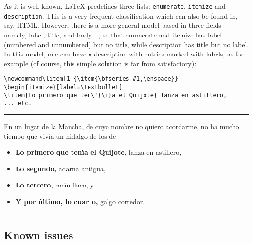 \documentclass[a4paper]{ltxguide}
\begin{document}
\begin{enumerate}[leftmargin=*]
\begin{enumerate}[leftmargin=\parindent]
\begin{enumerate}[labelindent=\parindent,|\allowbreak
| leftmargin=*,|\allowbreak| label=\Roman*.,|\allowbreak
| widest=III,|\allowbreak| align=left]
\begin{enumerate}[label=\fbox{\arabic*}]
As it is well known, \LaTeX{} predefines three lists:
\texttt{enumerate}, \texttt{itemize} and \texttt{description}.  This
is a very frequent classification which can also be found in, say,
HTML. However, there is a more general model based in three
fields---namely, label, title, and body---, so that enumerate and
itemize has label (numbered and unnumbered) but no title, while
description has title but no label.  In this model, one can have a
description with entries marked with labels, as for example (of 
course, this simple solution is far from satisfactory):
\begin{verbatim}
\newcommand\litem[1]{\item{\bfseries #1,\enspace}}
\begin{itemize}[label=\textbullet]
\litem{Lo primero que ten\'{\i}a el Quijote} lanza en astillero,
... etc.
\end{verbatim}

\vskip6pt
\goodbreak
\hrule
\vskip6pt

\newcommand\litem[1]{\item{\bfseries #1,\enspace}}
En un lugar de la Mancha, de cuyo nombre no quiero acordarme,
no ha mucho tiempo que viv\'{\i}a un hidalgo de los de
\begin{itemize}[label=\textbullet]
\litem{Lo primero que ten\'{\i}a el Quijote} lanza en astillero,
\litem{Lo segundo} adarna antigua,
\litem{Lo tercero} roc\'{\i}n flaco, y
\litem{Y por \'{u}ltimo, lo cuarto} galgo corredor.
\end{itemize}

\vskip6pt
\goodbreak
\hrule
\vskip6pt


\subsection{Known issues}

\end{enumerate}
\end{enumerate}
\end{enumerate}
\end{enumerate}
\end{document}
